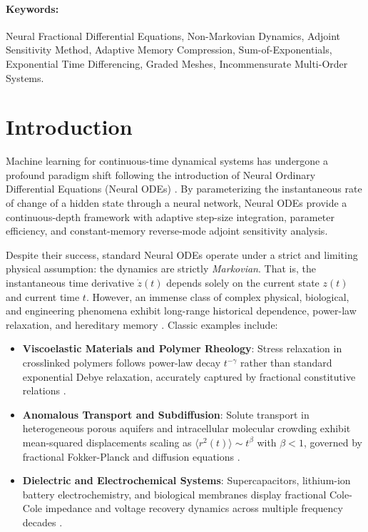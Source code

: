 \documentclass[11pt,a4paper]{article}
\theoremstyle{plain}
\theoremstyle{definition}
\begin{document}
\paragraph{Keywords:} Neural Fractional Differential Equations, Non-Markovian Dynamics, Adjoint Sensitivity Method, Adaptive Memory Compression, Sum-of-Exponentials, Exponential Time Differencing, Graded Meshes, Incommensurate Multi-Order Systems.

\newpage
\tableofcontents
\newpage

\section{Introduction}
\label{sec:intro}

Machine learning for continuous-time dynamical systems has undergone a profound paradigm shift following the introduction of Neural Ordinary Differential Equations (Neural ODEs) \cite{chen2018neural}. By parameterizing the instantaneous rate of change of a hidden state through a neural network, Neural ODEs provide a continuous-depth framework with adaptive step-size integration, parameter efficiency, and constant-memory reverse-mode adjoint sensitivity analysis. 

Despite their success, standard Neural ODEs operate under a strict and limiting physical assumption: the dynamics are strictly \emph{Markovian}. That is, the instantaneous time derivative $\dot{z}(t)$ depends solely on the current state $z(t)$ and current time $t$. However, an immense class of complex physical, biological, and engineering phenomena exhibit long-range historical dependence, power-law relaxation, and hereditary memory \cite{podlubny1999fractional,magin2006fractional,diethelm2010analysis}. Classic examples include:
\begin{itemize}
    \item \textbf{Viscoelastic Materials and Polymer Rheology}: Stress relaxation in crosslinked polymers follows power-law decay $t^{-\gamma}$ rather than standard exponential Debye relaxation, accurately captured by fractional constitutive relations \cite{caputo1967linear}.
    \item \textbf{Anomalous Transport and Subdiffusion}: Solute transport in heterogeneous porous aquifers and intracellular molecular crowding exhibit mean-squared displacements scaling as $\langle r^2(t) \rangle \sim t^\beta$ with $\beta < 1$, governed by fractional Fokker-Planck and diffusion equations \cite{stynes2017error}.
    \item \textbf{Dielectric and Electrochemical Systems}: Supercapacitors, lithium-ion battery electrochemistry, and biological membranes display fractional Cole-Cole impedance and voltage recovery dynamics across multiple frequency decades \cite{magin2006fractional,hartley2003fractional}.
\end{itemize}
\end{document}
